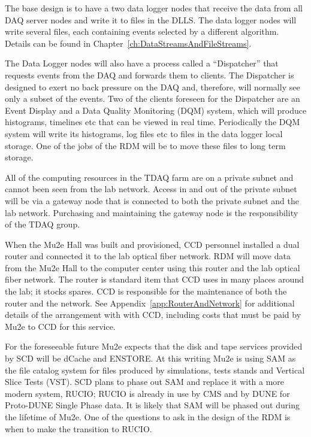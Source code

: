 The base design is to have a two data logger nodes that receive the data from all DAQ server nodes
and write it to files in the DLLS.
The data logger nodes will write several files, each containing events selected by a different algorithm.
Details can be found in Chapter~\ref{ch:DataStreamsAndFileStreams}.

The Data Logger nodes will also have a process called a ``Dispatcher''
that requests events from the DAQ and forwards them to clients.
The Dispatcher is designed to exert no back pressure on the DAQ
and, therefore, will normally see only a subset of the events.
Two of the clients foreseen for the Dispatcher are an Event Display and
a Data Quality Monitoring (DQM) system,
which will produce histograms, timelines etc that can be viewed in real time.
Periodically the DQM system will write its histograms, log files etc to
files in the data logger local storage.  One of the jobs of the RDM will be
to move these files to long term storage.

All of the computing resources in the TDAQ farm are on a private subnet
and cannot been seen from the lab network.  Access in and out
of the private subnet will be via a gateway node that is connected to
both the private subnet and the lab network.
Purchasing and maintaining the gateway node is the responsibility of the TDAQ group.

When the Mu2e Hall was built and provisioned, CCD personnel installed a dual router
and connected it to the lab optical fiber network.
RDM will move data from the Mu2e Hall
to the computer center using this router and the lab optical fiber network.
The router is standard item that CCD uses in many places around the lab; it stocks spares.
CCD is responsible for the maintenance of both the router and the network.
See Appendix~\ref{app:RouterAndNetwork} for additional details of the arrangement with with CCD,
including costs that must be paid by Mu2e to CCD for this service.


For the foreseeable future Mu2e expects that the disk and tape services provided
by SCD will be dCache and ENSTORE.
At this writing Mu2e is using SAM as the file catalog system for files produced
by simulations, tests stands and Vertical Slice Tests (VST).
SCD plans to phase out SAM and replace it with a more modern system, RUCIO\cite{RUCIOHome};
RUCIO is already in use by CMS and by DUNE for Proto-DUNE Single Phase data.
It is likely that SAM will be phased out during the lifetime of Mu2e.
One of the questions to ask in the design of the RDM is
when to make the transition to RUCIO.

